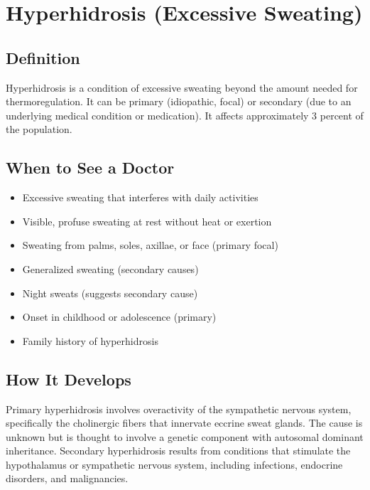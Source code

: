 \chapter{Hyperhidrosis (Excessive Sweating)}

\section*{Definition}
Hyperhidrosis is a condition of excessive sweating beyond the amount needed for thermoregulation. It can be primary (idiopathic, focal) or secondary (due to an underlying medical condition or medication). It affects approximately 3 percent of the population.

\section*{When to See a Doctor}
\begin{itemize}
\item Excessive sweating that interferes with daily activities
\item Visible, profuse sweating at rest without heat or exertion
\item Sweating from palms, soles, axillae, or face (primary focal)
\item Generalized sweating (secondary causes)
\item Night sweats (suggests secondary cause)
\item Onset in childhood or adolescence (primary)
\item Family history of hyperhidrosis
\end{itemize}

\section*{How It Develops}
Primary hyperhidrosis involves overactivity of the sympathetic nervous system, specifically the cholinergic fibers that innervate eccrine sweat glands. The cause is unknown but is thought to involve a genetic component with autosomal dominant inheritance. Secondary hyperhidrosis results from conditions that stimulate the hypothalamus or sympathetic nervous system, including infections, endocrine disorders, and malignancies.

